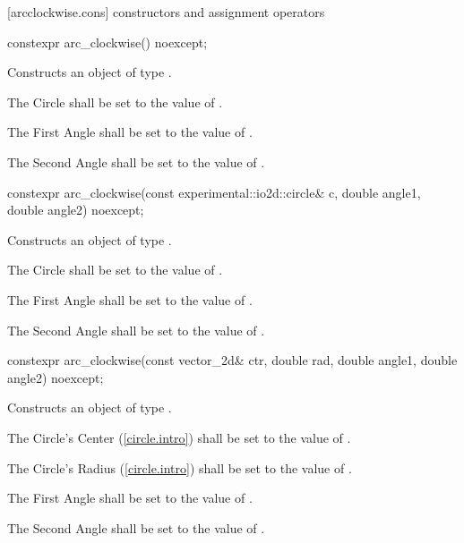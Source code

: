  [arcclockwise.cons] { constructors and assignment operators}

\begin{itemdecl}
constexpr arc_clockwise() noexcept;
\end{itemdecl}
\begin{itemdescr}
\pnum
\effects
Constructs an object of type .

\pnum
The Circle shall be set to the value of .

\pnum
The First Angle shall be set to the value of .

\pnum
The Second Angle shall be set to the value of .
\end{itemdescr}

\begin{itemdecl}
constexpr arc_clockwise(const experimental::io2d::circle& c, double angle1,
  double angle2) noexcept;
\end{itemdecl}
\begin{itemdescr}
\pnum
\effects
Constructs an object of type .

\pnum
The Circle shall be set to the value of .

\pnum
The First Angle shall be set to the value of .

\pnum
The Second Angle shall be set to the value of .
\end{itemdescr}

\begin{itemdecl}
constexpr arc_clockwise(const vector_2d& ctr, double rad, double angle1,
  double angle2) noexcept;
\end{itemdecl}
\begin{itemdescr}
\pnum
\effects
Constructs an object of type .

\pnum
The Circle's Center (\ref{circle.intro}) shall be set to the value of .

\pnum
The Circle's Radius (\ref{circle.intro}) shall be set to the value of .

\pnum
The First Angle shall be set to the value of .

\pnum
The Second Angle shall be set to the value of .
\end{itemdescr}

